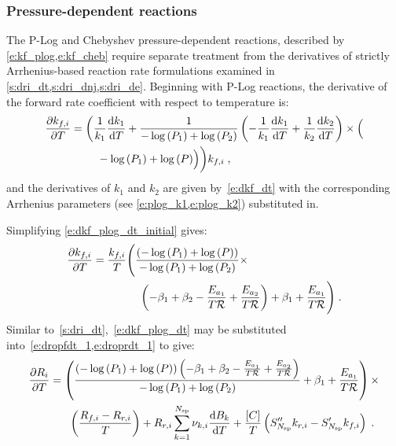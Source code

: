 \documentclass[12pt,number,sort&compress]{elsarticle}
\begin{document}
\subsubsection{Pressure-dependent reactions}
\label{s:dri_pdep}
The P-Log and Chebyshev pressure-dependent reactions, described by \cref{e:kf_plog,e:kf_cheb} require separate treatment from the derivatives of strictly Arrhenius-based reaction rate formulations examined in \cref{s:dri_dt,s:dri_dnj,s:dri_de}.
Beginning with P-Log reactions, the derivative of the forward rate coefficient with respect to temperature is:
\begin{align}
 \label{e:dkf_plog_dt_initial}
 \frac{\partial {k_{f, i}} }{\partial T } &= \biggl( \frac{1}{k_{1}} \frac{\text{d} k_1 }{\text{d} T } + \frac{1}{- \log{\left (P_{1} \right )} + \log{\left (P_{2} \right )}} \left(- \frac{1}{k_{1}} \frac{\text{d} k_1 }{\text{d} T } + \frac{1}{k_{2}} \frac{\text{d} k_2 }{\text{d} T }\right) \times  \Bigl( \nonumber \\
					 & \mathindent - \log{\left (P_{1} \right )} + \log{\left (P \right )}\Bigr)\biggr) {k_{f, i}}\;,
\end{align}
and the derivatives of $k_{1}$ and $k_{2}$ are given by~\cref{e:dkf_dt} with the corresponding Arrhenius parameters (see \cref{e:plog_k1,e:plog_k2}) substituted in.

Simplifying \cref{e:dkf_plog_dt_initial} gives:
\begin{align}
 \label{e:dkf_plog_dt}
 \frac{\partial {k_{f, i}} }{\partial T } &= \frac{{k_{f, i}}}{T} \Biggl(\frac{\left(- \log{\left (P_{1} \right )} + \log{\left (P \right )}\right)}{- \log{\left (P_{1} \right )} + \log{\left (P_{2} \right )}} \times \nonumber \\
					 & \mathindent[morespac] \left(- \beta_1 + \beta_2 - \frac{E_{a_1}}{T \Ru/} + \frac{E_{a_2}}{T \Ru/}\right) + \beta_1 + \frac{E_{a_1}}{T \Ru/}\Biggr)\;.
\end{align}
Similar to~\cref{s:dri_dt},~\cref{e:dkf_plog_dt} may be substituted into~\cref{e:dropfdt_1,e:droprdt_1} to give:
\begin{align}
 \label{e:drop_plog_dT}
 \frac{\partial R_{i} }{\partial T } &= \left(\frac{\left(- \log{\left (P_{1} \right )} + \log{\left (P \right )}\right) \left(- \beta_1 + \beta_2 - \frac{E_{a_1}}{T \Ru/} + \frac{E_{a_2}}{T \Ru/}\right)}{- \log{\left (P_{1} \right )} + \log{\left (P_{2} \right )}} + \beta_1 + \frac{E_{a_1}}{T \Ru/} \right) \times \nonumber \\
				     & \mathindent[less] \left(\frac{{R_{f, i}} - {R_{r, i}}}{T}\right) + {R_{r, i}} \sum_{k=1}^{\ns/} \nu_{k,i} \frac{\text{d} B_{k} }{\text{d} T } + \frac{[C]}{T} \left(S^{\prime\prime}_{\ns/} {k_{r, i}} - S^{\prime}_{\ns/} {k_{f, i}}\right)\;.
\end{align}
\end{document}
